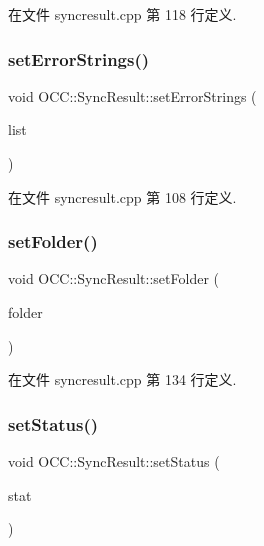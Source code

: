 在文件 syncresult.\+cpp 第 118 行定义.

\mbox{\label{class_o_c_c_1_1_sync_result_aad94fb29ac3628b8d1f14e47ed7690ae}} 
\subsubsection{\texorpdfstring{set\+Error\+Strings()}{setErrorStrings()}}
{\footnotesize\ttfamily void O\+C\+C\+::\+Sync\+Result\+::set\+Error\+Strings (\begin{DoxyParamCaption}\item[{const Q\+String\+List \&}]{list }\end{DoxyParamCaption})}



在文件 syncresult.\+cpp 第 108 行定义.

\mbox{\label{class_o_c_c_1_1_sync_result_a52ca3cc54ff3d4ba91ce9eb6a9ed5090}} 
\subsubsection{\texorpdfstring{set\+Folder()}{setFolder()}}
{\footnotesize\ttfamily void O\+C\+C\+::\+Sync\+Result\+::set\+Folder (\begin{DoxyParamCaption}\item[{const Q\+String \&}]{folder }\end{DoxyParamCaption})}



在文件 syncresult.\+cpp 第 134 行定义.

\mbox{\label{class_o_c_c_1_1_sync_result_a86da20d2138f05d966c916f7a2731399}} 
\subsubsection{\texorpdfstring{set\+Status()}{setStatus()}}
{\footnotesize\ttfamily void O\+C\+C\+::\+Sync\+Result\+::set\+Status (\begin{DoxyParamCaption}\item[{\hyperlink{class_o_c_c_1_1_sync_result_a4f4487ea8c462f2ec90c43bce6df1d1e}{Status}}]{stat }\end{DoxyParamCaption})}



